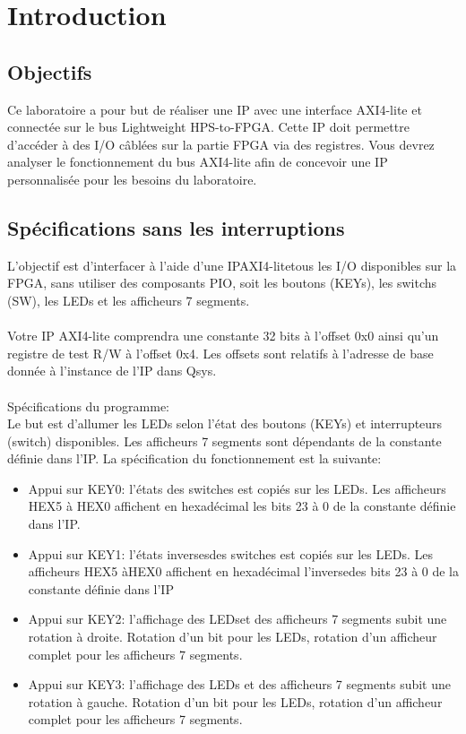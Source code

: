 \section{Introduction}

\subsection{Objectifs}
Ce laboratoire a pour but de réaliser une IP avec une interface AXI4-lite et connectée sur le bus Lightweight HPS-to-FPGA. Cette IP doit permettre d’accéder à des I/O câblées sur  la  partie  FPGA  via  des registres.  Vous  devrez  analyser  le  fonctionnement  du  bus AXI4-lite afin de concevoir une IP personnalisée pour les besoins du laboratoire.

\subsection{Spécifications sans les interruptions}
L'objectif est d'interfacer à l'aide d'une IPAXI4-litetous les I/O disponibles sur la FPGA, sans utiliser des composants PIO, soit les boutons (KEYs), les switchs (SW), les LEDs et les afficheurs 7 segments.\\\\ 
Votre IP AXI4-lite comprendra une constante 32 bits à l’offset 0x0 ainsi qu'un registre de test R/W à l’offset 0x4. Les offsets sont relatifs à l’adresse de base donnée à l'instance de l’IP dans Qsys.\\\\
Spécifications du programme:\\
Le but est d’allumer les LEDs selon l’état des boutons (KEYs) et interrupteurs (switch) disponibles.  Les  afficheurs  7  segments  sont  dépendants  de  la  constante  définie  dans l’IP. La spécification du fonctionnement est la suivante:\\
\begin{itemize}
	\item Appui sur KEY0: l'états des switches est copiés sur les LEDs. Les afficheurs HEX5 à HEX0 affichent en hexadécimal les bits 23 à 0 de la constante définie dans l’IP.\\
	\item Appui  sur  KEY1: l'états inversesdes  switches  est  copiés  sur  les  LEDs.  Les afficheurs HEX5 àHEX0 affichent en hexadécimal l’inversedes bits 23 à 0 de la constante définie dans l’IP
	\item Appui  sur  KEY2: l’affichage des LEDset  des  afficheurs  7  segments  subit  une rotation à droite. Rotation d’un bit pour les LEDs, rotation d’un afficheur complet pour les afficheurs 7 segments.
	\item Appui  sur  KEY3: l’affichage des LEDs et des afficheurs 7 segments subit une rotation à gauche. Rotation d’un bit pour les LEDs, rotation d’un afficheur complet pour les afficheurs 7 segments.\\
\end{itemize}


